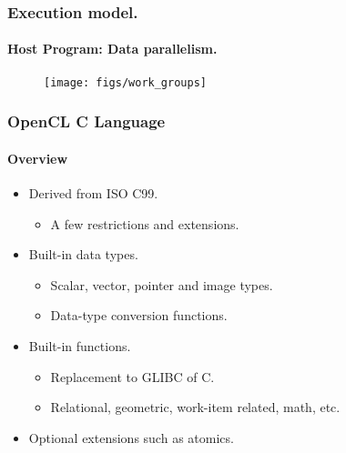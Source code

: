 \documentclass{beamer}
\begin{document}
\begin{frame}[fragile]
\frametitle{Execution model.}
\framesubtitle{Host Program: Data parallelism.}

  \begin{center}
  \begin{figure}
  \texttt{[image: figs/work\_groups]}
  \end{figure}
  \end{center}

\end{frame}

\begin{frame}
\frametitle{OpenCL C Language}
\framesubtitle{Overview}
  
  \begin{itemize}
  \item Derived from ISO C99.
    \begin{itemize}
    \item A few restrictions and extensions.
    \end{itemize}
  \item Built-in data types.
    \begin{itemize}
    \item Scalar, vector, pointer and image types.
    \item Data-type conversion functions.
    \end{itemize}
  \item Built-in functions.
    \begin{itemize}
    \item Replacement to GLIBC of C.
    \item Relational, geometric, work-item related, math, etc.
    \end{itemize}
  \item Optional extensions such as atomics.
  \end{itemize}
\end{frame}
\end{document}
